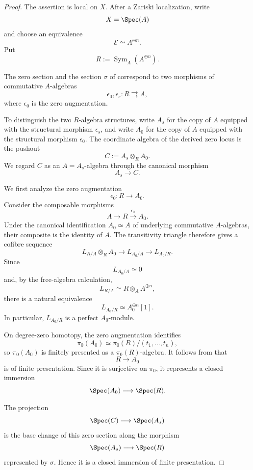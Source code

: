 \begin{proof}
The assertion is local on \(X\). After a Zariski localization, write
\[
    X
    =
    \Spec(A)
\]
and choose an equivalence
\[
    \mathcal E
    \simeq
    A^{\oplus n}.
\]
Put
\[
    R
    :=
    \operatorname{Sym}_A(A^{\oplus n}).
\]

The zero section and the section \(\sigma\) of
 correspond to two morphisms of commutative
\(A\)-algebras
\[
    \epsilon_0,\epsilon_s
    \colon
    R
    \rightrightarrows
    A,
\]
where \(\epsilon_0\) is the zero augmentation.

To distinguish the two \(R\)-algebra structures, write \(A_s\) for the
copy of \(A\) equipped with the structural morphism \(\epsilon_s\), and
write \(A_0\) for the copy of \(A\) equipped with the structural
morphism \(\epsilon_0\). The coordinate algebra of the derived zero
locus is the pushout
\[
    C
    :=
    A_s
    \otimes_R
    A_0.
\]
We regard \(C\) as an \(A=A_s\)-algebra through the canonical morphism
\[
    A_s
    \longrightarrow
    C.
\]

We first analyze the zero augmentation
\[
    \epsilon_0
    \colon
    R
    \longrightarrow
    A_0.
\]
Consider the composable morphisms
\[
    A
    \longrightarrow
    R
    \xrightarrow{\epsilon_0}
    A_0.
\]
Under the canonical identification \(A_0\simeq A\) of underlying
commutative \(A\)-algebras, their composite is the identity of \(A\).
The transitivity triangle therefore gives a cofibre sequence
\[
    L_{R/A}\otimes_RA_0
    \longrightarrow
    L_{A_0/A}
    \longrightarrow
    L_{A_0/R}.
\]
Since
\[
    L_{A_0/A}
    \simeq
    0
\]
and, by the free-algebra calculation,
\[
    L_{R/A}
    \simeq
    R\otimes_AA^{\oplus n},
\]
there is a natural equivalence
\[
    L_{A_0/R}
    \simeq
    A_0^{\oplus n}[1].
\]
In particular, \(L_{A_0/R}\) is a perfect \(A_0\)-module.

On degree-zero homotopy, the zero augmentation identifies
\[
    \pi_0(A_0)
    \simeq
    \pi_0(R)/(t_1,\ldots,t_n),
\]
so \(\pi_0(A_0)\) is finitely presented as a
\(\pi_0(R)\)-algebra. It follows from
 that
\[
    R
    \longrightarrow
    A_0
\]
is of finite presentation. Since it is surjective on \(\pi_0\), it
represents a closed immersion
\[
    \Spec(A_0)
    \longrightarrow
    \Spec(R).
\]

The projection
\[
    \Spec(C)
    \longrightarrow
    \Spec(A_s)
\]
is the base change of this zero section along the morphism
\[
    \Spec(A_s)
    \longrightarrow
    \Spec(R)
\]
represented by \(\sigma\). Hence it is a closed immersion of finite
presentation.


\end{proof}
